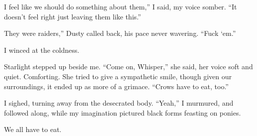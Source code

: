 \leavevmode{}I feel like we should do something about them,” I said, my voice somber. “It doesn’t feel right just leaving them like this.”

\leavevmode{}They were raiders,” Dusty called back, his pace never wavering. “Fuck ‘em.”

I winced at the coldness.

Starlight stepped up beside me. “Come on, Whisper,” she said, her voice soft and quiet. Comforting. She tried to give a sympathetic smile, though given our surroundings, it ended up as more of a grimace. “Crows have to eat, too.”

I sighed, turning away from the desecrated body. “Yeah,” I murmured, and followed along, while my imagination pictured black forms feasting on ponies.

We all have to eat.